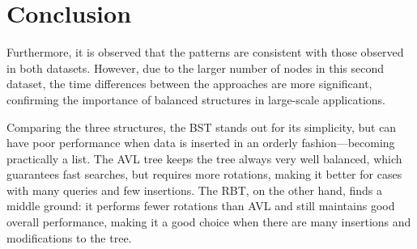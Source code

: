 \section{Conclusion}

 Furthermore, it is observed that the patterns are consistent with those observed in both datasets.
 However, due to the larger number of nodes in this second dataset, the time differences between the approaches
 are more significant, confirming the importance of balanced structures in large-scale applications.

 Comparing the three structures, the BST stands out for its simplicity, but can have poor performance when data is inserted in an orderly fashion—becoming practically a list.
 The AVL tree keeps the tree always very well balanced, which guarantees fast searches, but requires more rotations, making it better for cases with many queries and few insertions.
 The RBT, on the other hand, finds a middle ground: it performs fewer rotations than AVL and still maintains good overall performance, making it a good choice when there are many insertions and modifications to the tree.